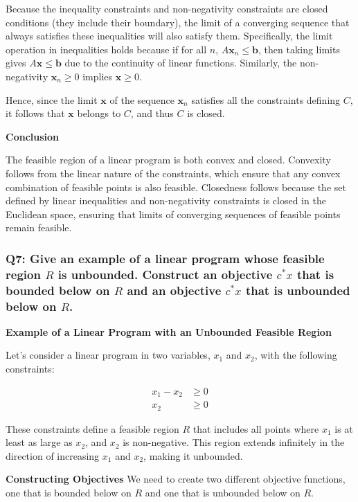 \documentclass[8pt]{article}
\begin{document}
Because the inequality constraints and non-negativity constraints are closed conditions (they include their boundary), the limit of a converging sequence that always satisfies these inequalities will also satisfy them. Specifically, the limit operation in inequalities holds because if for all \( n \), \( A \mathbf{x}_n \leq \mathbf{b} \), then taking limits gives \( A \mathbf{x} \leq \mathbf{b} \) due to the continuity of linear functions. Similarly, the non-negativity \( \mathbf{x}_n \geq 0 \) implies \( \mathbf{x} \geq 0 \).

Hence, since the limit \( \mathbf{x} \) of the sequence \( \mathbf{x}_n \) satisfies all the constraints defining \( C \), it follows that \( \mathbf{x} \) belongs to \( C \), and thus \( C \) is closed.

\textbf{Conclusion}

The feasible region of a linear program is both convex and closed. Convexity follows from the linear nature of the constraints, which ensure that any convex combination of feasible points is also feasible. Closedness follows because the set defined by linear inequalities and non-negativity constraints is closed in the Euclidean space, ensuring that limits of converging sequences of feasible points remain feasible.

\subsubsection*{Q7: Give an example of a linear program whose feasible region \(R\) is unbounded. Construct an objective \(c^* x\) that is bounded below on \(R\) and an objective \(c^* x\) that is unbounded below on \(R\).}

\textbf{Example of a Linear Program with an Unbounded Feasible Region}

Let's consider a linear program in two variables, \(x_1\) and \(x_2\), with the following constraints:

\begin{align*}
x_1 - x_2 &\geq 0 \\
x_2 &\geq 0
\end{align*}

These constraints define a feasible region \(R\) that includes all points where \(x_1\) is at least as large as \(x_2\), and \(x_2\) is non-negative. This region extends infinitely in the direction of increasing \(x_1\) and \(x_2\), making it unbounded.

\textbf{Constructing Objectives}
We need to create two different objective functions, one that is bounded below on \(R\) and one that is unbounded below on \(R\).
\end{document}
